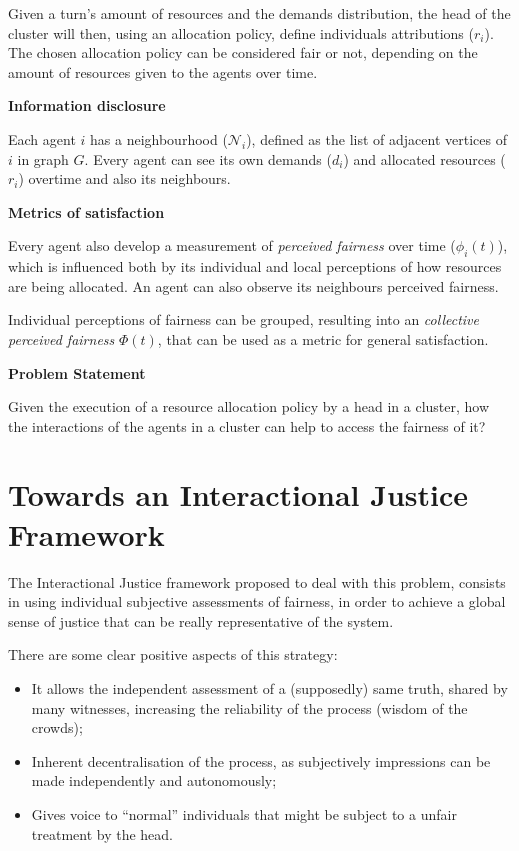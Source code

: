 \documentclass[conference,compsoc]{IEEEtran}
\begin{document}
Given a turn's amount of resources and the demands distribution, the head of the cluster will then, using an allocation policy, define individuals attributions ($r_i$). The chosen allocation policy can be considered fair or not, depending on the amount of resources given to the agents over time.

\noindent
\textbf{Information disclosure}

Each agent $i$ has a neighbourhood ($\mathcal{N}_i$), defined as the list of adjacent vertices of $i$ in graph $G$. Every agent can see its own demands ($d_i$) and allocated resources ($r_i$) overtime and also its neighbours. 

\noindent
\textbf{Metrics of satisfaction}

Every agent also develop a measurement of  \emph{perceived fairness} over time ($\phi_i(t)$), which is influenced both by its individual and local perceptions of how resources are being allocated. An agent can also observe its neighbours perceived fairness.

Individual perceptions of fairness can be grouped, resulting into an \emph{collective perceived fairness} $\Phi(t)$, that can be used as a metric for general satisfaction.

\noindent
\textbf{Problem Statement}

Given the execution of a resource allocation policy by a head in a cluster, how the interactions of the agents in a cluster can help to access the fairness of it?


\section{Towards an Interactional Justice Framework}

The Interactional Justice framework proposed to deal with this problem, consists in using individual subjective assessments of fairness, in order to achieve a global sense of justice that can be really representative of the system.

There are some clear positive aspects of this strategy:
\begin{itemize}
    \item It allows the independent assessment of a (supposedly) same truth, shared by many witnesses, increasing the reliability of the process (wisdom of the crowds);
    \item Inherent decentralisation of the process, as subjectively impressions can be made independently and autonomously;
    \item Gives voice to ``normal'' individuals that might be subject to a unfair treatment by the head.
\end{itemize}
\end{document}
